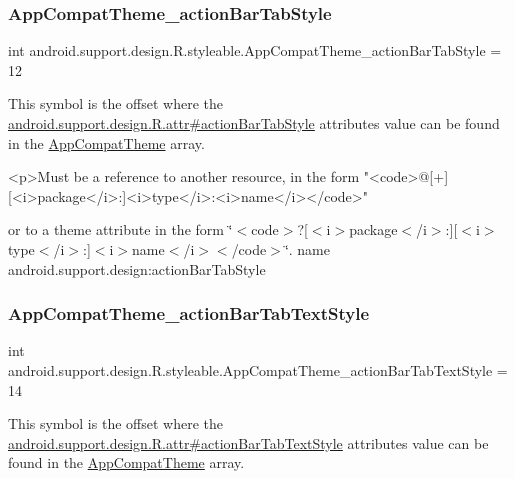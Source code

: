 \subsubsection{\texorpdfstring{App\+Compat\+Theme\+\_\+action\+Bar\+Tab\+Style}{AppCompatTheme\_actionBarTabStyle}}
{\footnotesize\ttfamily int android.\+support.\+design.\+R.\+styleable.\+App\+Compat\+Theme\+\_\+action\+Bar\+Tab\+Style = 12\hspace{0.3cm}{\ttfamily [static]}}

This symbol is the offset where the \hyperlink{classandroid_1_1support_1_1design_1_1R_1_1attr_acf3735cc1f6496c4924b89004afa2e4f}{android.\+support.\+design.\+R.\+attr\#action\+Bar\+Tab\+Style} attribute\textquotesingle{}s value can be found in the \hyperlink{classandroid_1_1support_1_1design_1_1R_1_1styleable_afb351dc8de20cbd4c89abe360373010c}{App\+Compat\+Theme} array.

\begin{DoxyVerb}      <p>Must be a reference to another resource, in the form "<code>@[+][<i>package</i>:]<i>type</i>:<i>name</i></code>"
\end{DoxyVerb}
 or to a theme attribute in the form \char`\"{}$<$code$>$?\mbox{[}$<$i$>$package$<$/i$>$\+:\mbox{]}\mbox{[}$<$i$>$type$<$/i$>$\+:\mbox{]}$<$i$>$name$<$/i$>$$<$/code$>$\char`\"{}.  name android.\+support.\+design\+:action\+Bar\+Tab\+Style \mbox{\label{classandroid_1_1support_1_1design_1_1R_1_1styleable_afd214b041105e6d734d0bcb07952db44}} 
\subsubsection{\texorpdfstring{App\+Compat\+Theme\+\_\+action\+Bar\+Tab\+Text\+Style}{AppCompatTheme\_actionBarTabTextStyle}}
{\footnotesize\ttfamily int android.\+support.\+design.\+R.\+styleable.\+App\+Compat\+Theme\+\_\+action\+Bar\+Tab\+Text\+Style = 14\hspace{0.3cm}{\ttfamily [static]}}

This symbol is the offset where the \hyperlink{classandroid_1_1support_1_1design_1_1R_1_1attr_aa71a022be5ee164ec1d42d561579b45d}{android.\+support.\+design.\+R.\+attr\#action\+Bar\+Tab\+Text\+Style} attribute\textquotesingle{}s value can be found in the \hyperlink{classandroid_1_1support_1_1design_1_1R_1_1styleable_afb351dc8de20cbd4c89abe360373010c}{App\+Compat\+Theme} array.

